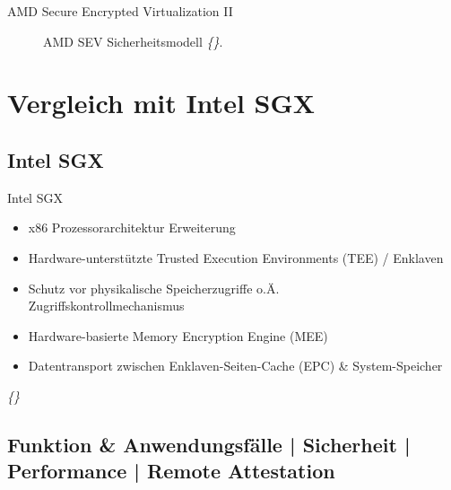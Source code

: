 \documentclass{sdqbeamer}
\begin{document}
\begin{frame}{AMD Secure Encrypted Virtualization II}
\begin{minipage}{0.39\linewidth}
\begin{figure}[!h]
			\caption{AMD SEV Sicherheitsmodell \textit{\{\cite{kaplan}\}}. }
		\end{figure}
	\end{minipage}
\end{frame}


\section{Vergleich mit Intel SGX}

\subsection{Intel SGX}
\begin{frame}{Intel SGX}
	\begin{itemize}
		\item x86 Prozessorarchitektur Erweiterung
		\item Hardware-unterstützte Trusted Execution Environments (TEE) / Enklaven
		\item Schutz vor physikalische Speicherzugriffe o.Ä.\\
			Zugriffskontrollmechanismus
		\item Hardware-basierte Memory Encryption Engine (MEE)
		\item Datentransport zwischen Enklaven-Seiten-Cache (EPC) \& System-Speicher
	\end{itemize}
	\vfill
	\small\textit{\{\cite{costan, knauth, mofrad, swami}\}}
\end{frame}

\subsection{Funktion \& Anwendungsfälle | Sicherheit | Performance | Remote Attestation}
\end{document}
